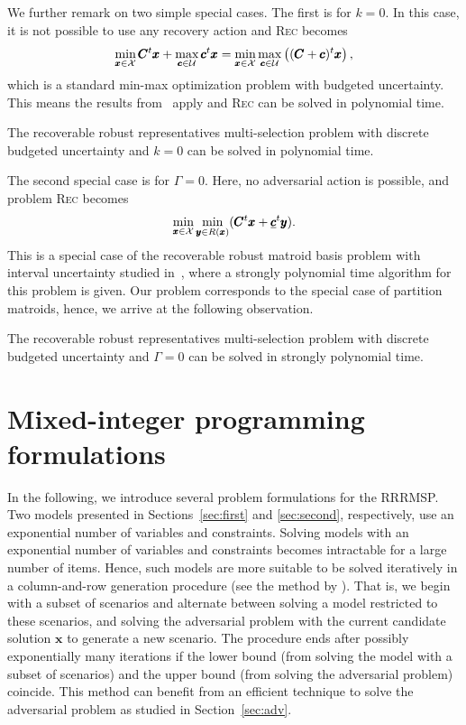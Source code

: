 We further remark on two simple special cases. The first is for $k=0$. In this case, it is not possible to use any recovery action and \textsc{Rec} becomes
\[ \min_{\pmb{x}\in\mathcal{X}} \pmb{C}^t\pmb{x} + \max_{\pmb{c}\in\mathcal{U}} \pmb{c}^t\pmb{x} 
=  \min_{\pmb{x}\in\mathcal{X}} \max_{\pmb{c}\in\mathcal{U}} \left( (\pmb{C}+\pmb{c})^t \pmb{x} \right), \]
which is a standard min-max optimization problem with budgeted uncertainty. This means the results from~\cite{bertsimas2003robust} apply and \textsc{Rec} can be solved in polynomial time.

\begin{observation}\label{obs1}
The recoverable robust representatives multi-selection problem with discrete budgeted uncertainty and $k=0$ can be solved in polynomial time.
\end{observation}

The second special case is for $\Gamma = 0$. Here, no adversarial action is possible, and problem \textsc{Rec} becomes
\[ \min_{\pmb{x}\in\mathcal{X}} \min_{\pmb{y}\in R(\pmb{x})} (\pmb{C}^t\pmb{x} + \underline{\pmb{c}}^t \pmb{y}). \]
This is a special case of the recoverable robust matroid basis problem with interval uncertainty studied in~\cite{lendl2019matroid},
where a strongly polynomial time algorithm for this problem is given. Our problem corresponds to the special case of partition matroids, 
hence, we arrive at the following observation.

\begin{observation}\label{obs2}
The recoverable robust representatives multi-selection problem with discrete budgeted uncertainty and $\Gamma=0$ can be solved in strongly polynomial time.
\end{observation}


\section{Mixed-integer programming formulations}
\label{sec:mips}

In the following, we introduce several problem formulations for the RRRMSP. Two models presented in Sections~\ref{sec:first} and \ref{sec:second}, respectively, use an exponential number of variables and constraints. 
Solving models with an exponential number of variables and constraints becomes intractable for a large number of items. Hence, such models are more suitable to be solved iteratively in a column-and-row generation procedure (see the method by \cite{zeng2013solving}).
That is, we begin with a subset of scenarios and alternate between solving a model restricted to these scenarios, and solving the adversarial problem with the current candidate solution $\pmb{x}$ to generate a new scenario. The procedure ends after possibly exponentially many iterations if the lower bound (from solving the model with a subset of scenarios) and the upper bound (from solving the adversarial problem) coincide.  This method can benefit from an efficient technique to solve the adversarial problem as studied in Section~\ref{sec:adv}.


